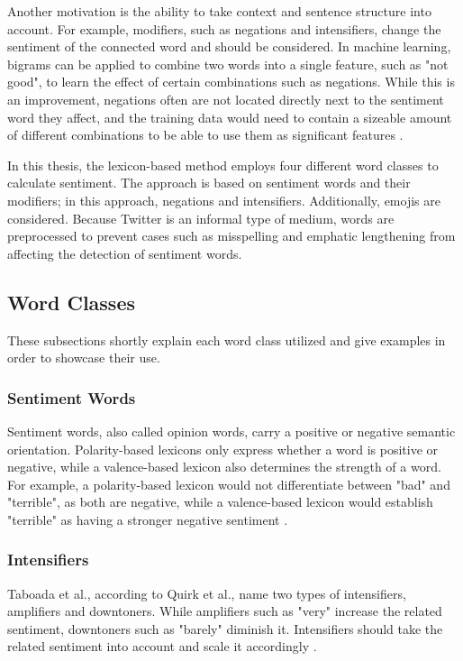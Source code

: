 Another motivation is the ability to take context and sentence structure into account. For example, modifiers, such as negations and intensifiers, change the sentiment of the connected word and should be considered. In machine learning, bigrams can be applied to combine two words into a single feature, such as "not good", to learn the effect of certain combinations such as negations. While this is an improvement, negations often are not located directly next to the sentiment word they affect, and the training data would need to contain a sizeable amount of different combinations to be able to use them as significant features \cite{taboada}.

In this thesis, the lexicon-based method employs four different word classes to calculate sentiment. The approach is based on sentiment words and their modifiers; in this approach, negations and intensifiers. Additionally, emojis are considered. Because Twitter is an informal type of medium, words are preprocessed to prevent cases such as misspelling and emphatic lengthening from affecting the detection of sentiment words.

\subsection{Word Classes}
These subsections shortly explain each word class utilized and give examples in order to showcase their use.

\subsubsection{Sentiment Words}
Sentiment words, also called opinion words, carry a positive or negative semantic orientation. Polarity-based lexicons only express whether a word is positive or negative, while a valence-based lexicon also determines the strength of a word. For example, a polarity-based lexicon would not differentiate between "bad" and "terrible", as both are negative, while a valence-based lexicon would establish "terrible" as having a stronger negative sentiment \cite{DBLP:conf/icwsm/HuttoG14}.

\subsubsection{Intensifiers}
Taboada et al., according to Quirk et al., name two types of intensifiers, amplifiers and downtoners. While amplifiers such as "very" increase the related sentiment, downtoners such as "barely" diminish it. Intensifiers should take the related sentiment into account and scale it accordingly \cite{taboada}.

